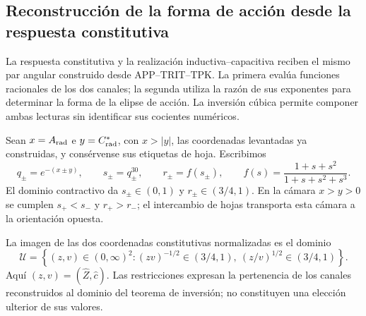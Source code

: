 \subsection{Reconstrucción de la forma de acción desde la respuesta constitutiva}
\label{iii:subsec:puente-forma-LC}

La respuesta constitutiva y la realización inductiva--capacitiva reciben
el mismo par angular construido desde APP--TRIT--TPK. La primera evalúa
funciones racionales de los dos canales; la segunda utiliza la razón de
sus exponentes para determinar la forma de la elipse de acción. La
inversión cúbica permite componer ambas lecturas sin identificar sus
cocientes numéricos.

Sean $x=A_{\rm rad}$ e $y=C^*_{\rm rad}$, con $x>|y|$, las coordenadas
levantadas ya construidas, y consérvense sus etiquetas de hoja. Escribimos
\begin{equation}
 q_\pm=e^{-(x\pm y)},\qquad s_\pm=q_\pm^{30},\qquad
 r_\pm=f(s_\pm),\qquad
 f(s)=\frac{1+s+s^2}{1+s+s^2+s^3}.
 \label{iii:eq:forma-canales}
\end{equation}
El dominio contractivo da $s_\pm\in(0,1)$ y
$r_\pm\in(3/4,1)$. En la cámara $x>y>0$ se cumplen
$s_+<s_-$ y $r_+>r_-$; el intercambio de hojas transporta esta cámara
a la orientación opuesta.

La imagen de las dos coordenadas constitutivas normalizadas es el dominio
\begin{equation}
 \mathcal U=\left\{(z,v)\in(0,\infty)^2:
   (zv)^{-1/2}\in(3/4,1),\
   (z/v)^{1/2}\in(3/4,1)\right\}.
 \label{iii:eq:forma-dominio}
\end{equation}
Aquí $(z,v)=(\widehat Z,\widehat c)$. Las restricciones expresan la
pertenencia de los canales reconstruidos al dominio del teorema de
inversión; no constituyen una elección ulterior de sus valores.

